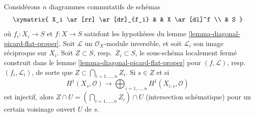 \begin{lemma}
\label{lemma-H1-O-multiple-picard-flat-proper}
Considérons $n$ diagrammes commutatifs de schémas
$$
\xymatrix{
X_i \ar[rr] \ar[dr]_{f_i} & & X \ar[dl]^f \\
& S
}
$$
où $f_i : X_i \to S$ et $f : X \to S$ satisfont les hypothèses du
lemme \ref{lemma-diagonal-picard-flat-proper}.
Soit $\mathcal{L}$ un $\mathcal{O}_X$-module inversible,
et soit $\mathcal{L}_i$ son image réciproque sur $X_i$. Soit $Z \subset S$,
resp.\ $Z_i \subset S$, le sous-schéma localement fermé construit
dans le lemme \ref{lemma-diagonal-picard-flat-proper}
pour $(f, \mathcal{L})$, resp.\ $(f_i, \mathcal{L}_i)$,
de sorte que $Z \subset \bigcap_{i = 1, \ldots, n} Z_i$. Si $s \in Z$ et si
$$
H^1(X_s, \mathcal{O}) \longrightarrow
\bigoplus\nolimits_{i = 1, \ldots, n} H^1(X_{i, s}, \mathcal{O})
$$
est injectif, alors $Z \cap U = (\bigcap_{i = 1, \ldots, n} Z_i) \cap U$
(intersection schématique) pour un certain voisinage ouvert $U$ de $s$.
\end{lemma}

